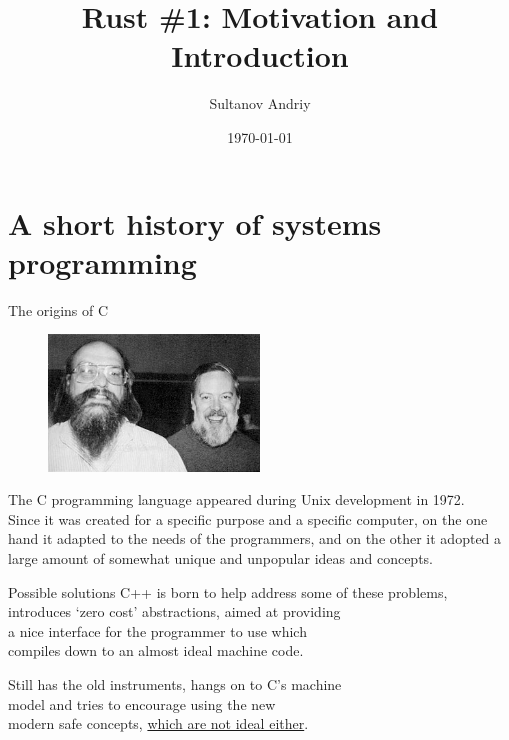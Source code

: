\documentclass[usenames,dvipsnames,10pt,aspectratio=169]{beamer}
\title[Rust \#1]{Rust \#1: Motivation and Introduction}
\date[\today]{\small\today}
\author[Sultanov Andriy]{Sultanov Andriy}
\institute{APPS@UCU}
\begin{document}
\begin{frame}
\titlepage
\end{frame}

\begin{frame}{\contentsname}
\tableofcontents
\end{frame}


\section{A short history of systems programming}

\begin{frame}{The origins of C}

\begin{figure}
\centering
\includegraphics[width=0.5\textwidth]{graphics/ritchie.jpg}
\end{figure}
\normalsize
The C programming language appeared during Unix development in 1972.\\

Since it was created for a specific purpose %
and a specific computer, %
on the one hand it adapted to the
needs of the programmers, and on the 
other it adopted a large
amount of somewhat unique and unpopular 
ideas and concepts.

\vskip 0.8cm

\end{frame}

\begin{frame}{Possible solutions}
\large
C++ is born to help address some of these problems,\\ 
introduces ‘zero cost’ abstractions, aimed at providing\\
a nice interface for the programmer to use which\\
compiles down to an almost ideal machine code.
\vspace{0.5cm}

Still has the old instruments, hangs on to C's machine\\
model %
and tries to encourage using the new\\ 
modern safe concepts, 
\href{https://alexgaynor.net/2019/apr/21/modern-c++-wont-save-us/}
{which are not ideal either}.


\end{frame}
\end{document}
